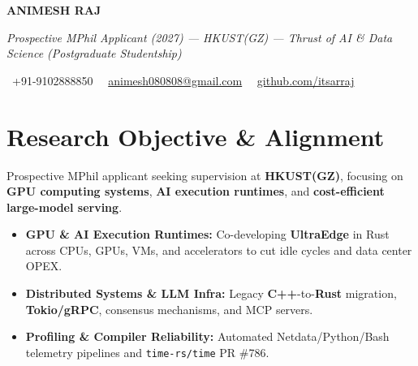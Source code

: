 \documentclass[a4paper,11pt]{article}
\newcommand{\socialicon}[1]{\raisebox{-0.05em}{\resizebox{!}{1em}{#1}}}
\newcommand{\headerfontiii}{\fontfamily{ppl}\selectfont} %
\begin{document}
\headerfontiii

\begin{center}
    {\Huge\textbf{ANIMESH RAJ}}
\end{center}
\vspace{-6mm}

\begin{center}
    {\small\textit{Prospective MPhil Applicant (2027) --- HKUST(GZ) — Thrust of AI \& Data Science (Postgraduate Studentship)}}
\end{center}
\vspace{-6mm}

\begin{center}
    {\small
    \socialicon{\faPhone}\ +91-9102888850 \textbar\ 
    \socialicon{\faEnvelope}\ \href{mailto:animesh080808@gmail.com}{animesh080808@gmail.com} \textbar\ 
    \socialicon{\faGithub}\ \href{https://github.com/itsarraj}{github.com/itsarraj}
    }
\end{center}
\vspace{-4mm}

\section{\textbf{Research Objective \& Alignment}}
\vspace{1mm}
{\small
Prospective MPhil applicant seeking supervision at \textbf{HKUST(GZ)}, focusing on \textbf{GPU computing systems}, \textbf{AI execution runtimes}, and \textbf{cost-efficient large-model serving}.
\begin{itemize}[leftmargin=3ex, itemsep=0.4mm, topsep=1mm]
    \item \textbf{GPU \& AI Execution Runtimes:} Co-developing \textbf{UltraEdge} in Rust across CPUs, GPUs, VMs, and accelerators to cut idle cycles and data center OPEX.
    \item \textbf{Distributed Systems \& LLM Infra:} Legacy \textbf{C++}-to-\textbf{Rust} migration, \textbf{Tokio/gRPC}, consensus mechanisms, and MCP servers.
    \item \textbf{Profiling \& Compiler Reliability:} Automated Netdata/Python/Bash telemetry pipelines and \texttt{time-rs/time} PR \#786.
\end{itemize}
}
\vspace{-3mm}
\end{document}
